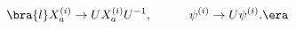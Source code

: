 \begin{equation}
\bra{l}
X_a^{(i)} \rightarrow U X_a^{(i)} U^{-1},~~~~~~~~~
\psi^{(i)} \rightarrow U \psi^{(i)}.
\era
\label{ctransf}
\end{equation}

